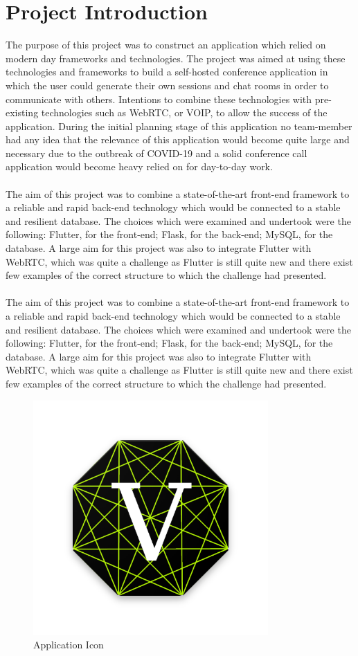 \section{Project Introduction}
The purpose of this project was to construct an application which relied on modern day frameworks and technologies. The project was aimed at using these technologies and frameworks to build a self-hosted conference application in which the user could generate their own sessions and chat rooms in order to communicate with others. Intentions to combine these technologies with pre-existing technologies such as WebRTC, or VOIP, to allow the success of the application. During the initial planning stage of this application no team-member had any idea that the relevance of this application would become quite large and necessary due to the outbreak of COVID-19 and a solid conference call application would become heavy relied on for day-to-day work.
\\\\ The aim of this project was to combine a state-of-the-art front-end framework to a reliable and rapid back-end technology which would be connected to a stable and resilient database. The choices which were examined and undertook were the following: Flutter, for the front-end; Flask, for the back-end; MySQL, for the database. A large aim for this project was also to integrate Flutter with WebRTC, which was quite a challenge as Flutter is still quite new and there exist few examples of the correct structure to which the challenge had presented.
\\\\ The aim of this project was to combine a state-of-the-art front-end framework to a reliable and rapid back-end technology which would be connected to a stable and resilient database. The choices which were examined and undertook were the following: Flutter, for the front-end; Flask, for the back-end; MySQL, for the database. A large aim for this project was also to integrate Flutter with WebRTC, which was quite a challenge as Flutter is still quite new and there exist few examples of the correct structure to which the challenge had presented.
\begin{figure}[h!]
    \caption{Application Icon}
    \label{image:vertexChatLogo}
    \centering
    \includegraphics[width=0.8\textwidth]{images/vertexChatLogo.png}
\end{figure}